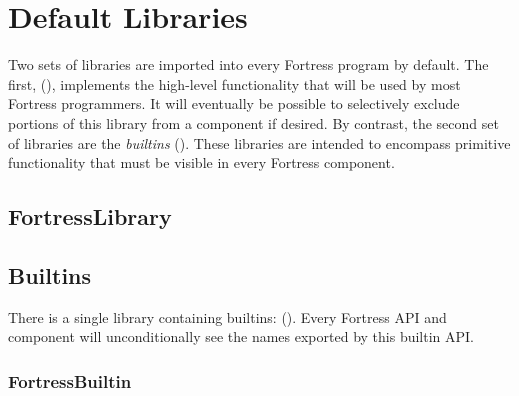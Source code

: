 %
%
%
%

\chapter{Default Libraries}

Two sets of libraries are imported into every Fortress program by
default.  The first,  (),
implements the high-level functionality that will be used by most
Fortress programmers.  It will eventually be possible to selectively
exclude portions of this library from a component if desired.  By
contrast, the second set of libraries are the \emph{builtins}
().  These libraries are intended to encompass
primitive functionality that must be visible in every Fortress
component.

\section{FortressLibrary}


\section{Builtins}

There is a single library containing builtins:
 ().
Every Fortress API and component will unconditionally see the names
exported by this builtin API.

\subsection{FortressBuiltin}

